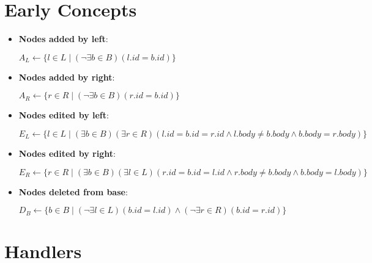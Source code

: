 \documentclass[a4paper]{article}
\begin{document}
    \section{Early Concepts}

    \begin{itemize}
        \item \textbf{Nodes added by left}:
        
        $A_L \leftarrow \{l \in L \mid (\lnot \exists b \in B)(l.id = b.id)\}$

        \item \textbf{Nodes added by right}:
        
        $A_R \leftarrow \{r \in R \mid (\lnot \exists b \in B)(r.id = b.id)\}$

        \item \textbf{Nodes edited by left}:
        
        $E_L \leftarrow \{l \in L \mid (\exists b \in B)(\exists r \in R)(l.id = b.id = r.id \land l.body \neq b.body \land b.body = r.body)\}$

        \item \textbf{Nodes edited by right}:
        
        $E_R \leftarrow \{r \in R \mid (\exists b \in B)(\exists l \in L)(r.id = b.id = l.id \land r.body \neq b.body \land b.body = l.body)\}$

        \item \textbf{Nodes deleted from base}:
        
        $D_B \leftarrow \{b \in B \mid (\lnot \exists l \in L)(b.id = l.id) \land (\lnot \exists r \in R)(b.id = r.id)\}$
    \end{itemize}

    

    \section{Handlers}

    
    
    
    
\end{document}
